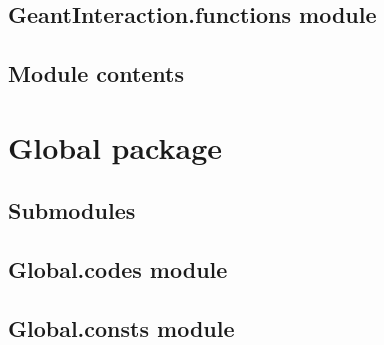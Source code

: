 \documentclass[letterpaper,10pt,english]{sphinxmanual}
\begin{document}
\subsection{GeantInteraction.functions module}
\label{\detokenize{GeantInteraction:geantinteraction-functions-module}}

\subsection{Module contents}
\label{\detokenize{GeantInteraction:module-GeantInteraction}}\label{\detokenize{GeantInteraction:module-contents}}
\sphinxstepscope


\section{Global package}
\label{\detokenize{Global:global-package}}\label{\detokenize{Global::doc}}

\subsection{Submodules}
\label{\detokenize{Global:submodules}}

\subsection{Global.codes module}
\label{\detokenize{Global:module-Global.codes}}\label{\detokenize{Global:global-codes-module}}

\subsection{Global.consts module}
\label{\detokenize{Global:module-Global.consts}}\label{\detokenize{Global:global-consts-module}}
\end{document}
